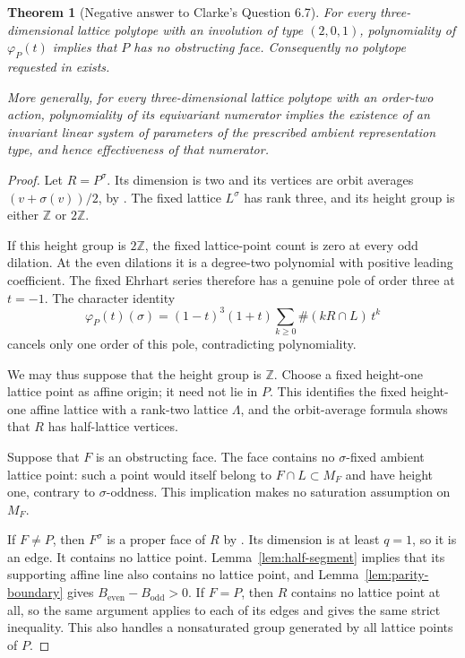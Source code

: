 \documentclass[11pt,a4paper]{article}
\newtheorem{theorem}{Theorem}
\theoremstyle{definition}\newtheorem{definition}[lemma]{Definition}
\theoremstyle{remark}\newtheorem{remark}[lemma]{Remark}
\begin{document}
\begin{theorem}[Negative answer to Clarke's Question 6.7]
\label{thm:clarke-dimension-three}
For every three-dimensional lattice polytope with an involution of type
$(2,0,1)$, polynomiality of $\varphi_P(t)$ implies that $P$ has no
obstructing face. Consequently no polytope requested in
\cite[Question~6.7]{Clarke26} exists.

More generally, for every three-dimensional lattice polytope with an
order-two action, polynomiality of its equivariant numerator implies the
existence of an invariant linear system of parameters of the prescribed
ambient representation type, and hence effectiveness of that numerator.
\end{theorem}
\begin{proof}
Let $R=P^\sigma$. Its dimension is two and its vertices are orbit averages
$(v+\sigma(v))/2$, by \cite[Lemma~2.2]{Clarke26}. The fixed lattice
$L^\sigma$ has rank three, and its height group is either $\mathbb Z$ or
$2\mathbb Z$.

If this height group is $2\mathbb Z$, the fixed lattice-point count is
zero at every odd dilation. At the even dilations it is a degree-two
polynomial with positive leading coefficient. The fixed Ehrhart series
therefore has a genuine pole of order three at $t=-1$. The character
identity
\begin{equation}\label{eq:three-dimensional-fixed-character}
 \varphi_P(t)(\sigma)
     =(1-t)^3(1+t)\sum_{k\geq0}\#(kR\cap L)\,t^k
\end{equation}
cancels only one order of this pole, contradicting polynomiality.

We may thus suppose that the height group is $\mathbb Z$. Choose a fixed
height-one lattice point as affine origin; it need not lie in $P$.
This identifies the fixed height-one affine lattice with a rank-two
lattice $\Lambda$, and the orbit-average formula shows that $R$ has
half-lattice vertices.

Suppose that $F$ is an obstructing face. The face contains no
$\sigma$-fixed ambient lattice point: such a point would itself belong to
$F\cap L\subset M_F$ and have height one, contrary to $\sigma$-oddness.
This implication makes no saturation assumption on $M_F$.

If $F\ne P$, then $F^\sigma$ is a proper face of $R$ by
\cite[Lemma~2.2(b)]{Clarke26}. Its dimension is at least $q=1$, so it is
an edge. It contains no lattice point. Lemma~\ref{lem:half-segment} implies
that its supporting affine line also contains no lattice point, and
Lemma~\ref{lem:parity-boundary} gives
$B_{\mathrm{even}}-B_{\mathrm{odd}}>0$.
If $F=P$, then $R$ contains no lattice point at all, so the same argument
applies to each of its edges and gives the same strict inequality. This
also handles a nonsaturated group generated by all lattice points of $P$.


\end{proof}
\end{document}
